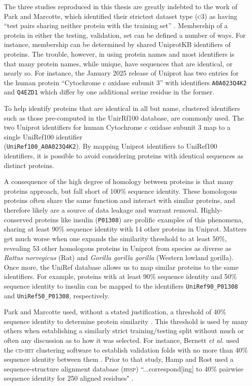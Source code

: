 The three studies reproduced in this thesis are greatly indebted to the work of Park and Marcotte, which identified their strictest dataset type (\textsc{c3}) as having ``test pairs sharing neither protein with the training set'' \cite{park_marcotte}. Membership of a protein in either the testing, validation, set can be defined a number of ways. For instance, membership can be determined by shared UniprotKB identifiers of proteins. The trouble, however, in using protein names and most identifiers is that many protein names, while unique, have sequences that are identical, or nearly so. For instance, the January 2025 release of Uniprot has two entries for the human protein ``Cytochrome c oxidase subunit 3'' with identifiers \texttt{A0A023Q4K2} and \texttt{Q4EZD1} which differ by one additional serine residue in the former. 

To help identify proteins that are identical in all but name, clustered identifiers such as those pre-computed in the UnirRf100 database, are commonly used. The two Uniprot identifiers for human Cytochrome c oxidase subunit 3 map to a single UniRef100 identifier \\(\texttt{UniRef100\_A0A023Q4K2}). By mapping Uniprot identifiers to UniRef100 identifiers, it is possible to avoid considering proteins with identical sequences as distinct proteins. 

A consequence of the high degree of homology between proteins is that many proteins approach, but fall short of 100\% sequence identity. These homologous proteins often share the same function and interact with similar proteins, and therefore likely are a source of data leakage and warrant removal. Highly-conserved proteins like insulin (\texttt{P01308}) are prolific examples of this phenomena, sharing at least 90\% sequence identity with 14 other proteins in Uniprot. Matters get much worse when one expands the similarity threshold to  at least 50\%, revealing 53 other homologous proteins in Uniprot from species as diverse as \textit{Rattus norvegicus} (Rat) and \textit{Gorilla gorilla gorilla} (Western lowland gorilla). Once more, the UniRef database allows us to map similar proteins to the same identifiers. For example, proteins with at least 90\% sequence identity and 50\% sequence identity to insulin can be mapped to the identifiers \texttt{UniRef90\_P01308} and \texttt{UniRef50\_P01308}, respectively.

Park and Marcotte used, without a stated justification, a threshold of 40\% sequence identity to determine protein similarity \cite{park_marcotte}. This threshold is used by many others when establishing a similarly strict training/testing split without much or often any discussion as to how it was selected. For instance, Bernett \textit{et al.} used the \textsc{cd-hit} clustering software to establish validation folds with no more than 40\% sequence identity between them \cite{black_box, cd_hit}. Prior to that study, Hamp and Rost used a sequence-structure alignment database (\textsc{hssp}) ``...correspond[ing] to 40\% pairwise sequence identity for 250 aligned residues" \cite{Hamp_Rost_2015, Sander_Schneider_1991, hssp}.

